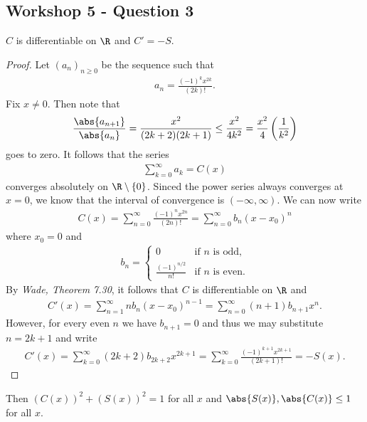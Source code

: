 \documentclass{article}
\begin{document}
\subsection*{Workshop 5 - Question 3}


\begin{claim*}
	$C$ is differentiable on $\R$ and $C'=-S$.
\end{claim*}
\begin{proof}
	Let $(a_n)_{n\geq 0}$ be the sequence such that
	\begin{align*}
		a_n = \frac{(-1)^{k}x^{2k}}{(2k)!}.
	\end{align*}
	Fix $x\not=0$. Then note that
	\begin{align*}
		\frac{\abs{a_{n+1}}}{\abs{a_n}} = \frac{x^2}{(2k+2)(2k+1)} \leq \frac{x^2}{4k^2} = \frac{x^2}{4}\left(\frac{1}{k^2}\right)
	\end{align*}
	goes to zero. It follows that the series
	\begin{align*}
		\sum_{k=0}^\infty a_k = C(x)
	\end{align*}
	converges absolutely on $\R\setminus\{0\}$.
	Sinced the power series always converges at $x=0$, we know that the interval of convergence is $(-\infty,\infty)$.
	We can now write
	\begin{align*}
		C(x) = \sum_{n=0}^\infty \frac{(-1)^{n}x^{2n}}{(2n)!} = \sum_{n=0}^\infty b_n(x-x_0)^n
	\end{align*}
	where $x_0=0$ and
	\begin{align*}
		b_n = \begin{cases}
			0                     & \text{if $n$ is odd},  \\
			\frac{(-1)^{n/2}}{n!} & \text{if $n$ is even}.
		\end{cases}
	\end{align*}
	By \emph{Wade, Theorem 7.30}, it follows that $C$ is differentiable on $\R$ and
	\begin{align*}
		C'(x) = \sum_{n=1}^\infty nb_n(x-x_0)^{n-1} = \sum_{n=0}^\infty (n+1)b_{n+1}x^n.
	\end{align*}
	However, for every even $n$ we have $b_{n+1}=0$ and thus we may substitute $n=2k+1$ and write
	\begin{align*}
		C'(x) = \sum_{k=0}^\infty (2k+2)b_{2k+2}x^{2k+1}
		= \sum_{k=0}^\infty \frac{(-1)^{k+1}x^{2k+1}}{(2k+1)!}
		= -S(x).
	\end{align*}
\end{proof}

\begin{claim*}
	Then $(C(x))^2 + (S(x))^2 = 1$ for all $x$ and $\abs{S(x)},\abs{C(x)}\leq 1$
	for all $x$.
\end{claim*}
\end{document}
